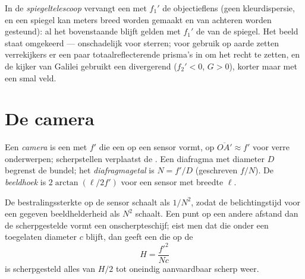 \begin{remark}\label{rem:b1:optical-instruments:variants}
In de \emph{spiegeltelescoop} vervangt een  met 
$f_1'$ de objectieflens (geen kleurdispersie, en een spiegel kan meters breed
worden gemaakt en van achteren worden gesteund): al het bovenstaande blijft
gelden met $f_1'$ de  van de spiegel. Het beeld staat
omgekeerd --- onschadelijk voor sterren; voor gebruik op aarde zetten
verrekijkers er een paar totaalreflecterende prisma's in om het recht te
zetten, en de kijker van Galilei gebruikt een divergerend 
($f_2' < 0$, $G > 0$), korter maar met een smal veld.
\end{remark}

\section{De camera}

\begin{definition}\label{def:b1:optical-instruments:camera}
Een \emph{camera} is een  met  $f'$ die een
 op een sensor vormt, op $\overline{OA'} \approx f'$ voor verre
onderwerpen; scherpstellen verplaatst de . Een diafragma met diameter $D$
begrenst de bundel; het \emph{diafragmagetal} is $N = f'/D$ (geschreven
$f/N$). De \emph{beeldhoek} is $2\arctan(\ell/2f')$ voor een sensor met
breedte $\ell$.
\end{definition}

\begin{proposition}\label{prop:b1:optical-instruments:dof}
De bestralingssterkte op de sensor schaalt als $1/N^2$, zodat de belichtingstijd
voor een gegeven beeldhelderheid als $N^2$ schaalt. Een punt op een andere
afstand dan de scherpgestelde vormt een onscherpteschijf; eist men dat die
onder een toegelaten diameter $c$ blijft, dan geeft een  die op de
\emph{}
\[
H = \frac{f'^2}{N c}
\]
is scherpgesteld alles van $H/2$ tot oneindig aanvaardbaar scherp weer.
\end{proposition}

